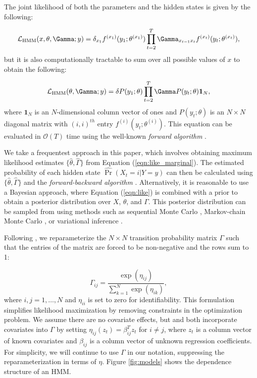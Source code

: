 The joint likelihood of both the parameters and the hidden states is given by the following:

\begin{equation}
    \calL_{\text{HMM}}(x,\theta,\Gamma;y) = \delta_{x_1} f^{(x_1)}(y_1; \theta^{(x_1)}) \prod_{t=2}^T \Gamma_{x_{t-1} x_t} f^{(x_t)}(y_t; \theta^{(x_t)}),
    \label{eqn:like}
\end{equation}
%
but it is also computationally tractable to sum over all possible values of $x$ to obtain the following:

\begin{equation}
    \calL_{\text{HMM}}(\theta,\Gamma;y) = \delta P(y_1;\theta) \prod_{t=2}^T \Gamma P(y_t;\theta) \mathbf{1}_N,
    \label{eqn:like_marginal}
\end{equation}
%
where $\mathbf{1}_N$ is an $N$-dimensional column vector of ones and $P(y_t;\theta)$ is an $N \times N$ diagonal matrix with $(i,i)^{th}$ entry $f^{(i)}(y_t; \theta^{(i)})$. This equation can be evaluated in $\mathcal{O}(T)$ time using the well-known \textit{forward algorithm} \citep{Zucchini:2016}.

We take a frequentest approach in this paper, which involves obtaining maximum likelihood estimates $\{\hat \theta, \hat \Gamma\}$ from Equation (\ref{eqn:like_marginal}). The estimated probability of each hidden state $\hat{\Pr}(X_t = i|Y = y)$ can then be calculated using $\{\hat \theta, \hat \Gamma\}$ and the \textit{forward-backward algorithm} \citep{Zucchini:2016}. Alternatively, it is reasonable to use a Bayesian approach, where Equation (\ref{eqn:like}) is combined with a prior to obtain a posterior distribution over $X$, $\theta$, and $\Gamma$. This posterior distribution can be sampled from using methods such as sequential Monte Carlo \citep{Douc:2011b}, Markov-chain Monte Carlo \citep{Scott:2002}, or variational inference \citep{Foti:2014}.
%

Following \citet{Barajas:2017}, we reparameterize the $N \times N$ transition probability matrix $\Gamma$ such that the entries of the matrix are forced to be non-negative and the rows sum to 1:

\[
\Gamma_{ij} = \frac{\exp(\eta_{ij})}{\sum_{k=1}^N \exp(\eta_{ik})}, 
\]
%
where $i,j = 1,\ldots,N$ and $\eta_{ii}$ is set to zero for identifiability. This formulation simplifies likelihood maximization by removing constraints in the optimization problem. We assume there are no covariate effects, but \cite{DeSouza:2017} and \citet{Adam:2019} both incorporate covariates into $\Gamma$ by setting $\eta_{ij}(z_t) = \beta_{ij}^T z_t$ for $i \neq j$, where $z_t$ is a column vector of known covariates and $\beta_{ij}$ is a column vector of unknown regression coefficients. For simplicity, we will continue to use $\Gamma$ in our notation, suppressing the reparameterization in terms of $\eta$. Figure \ref{fig:models} shows the dependence structure of an HMM.

